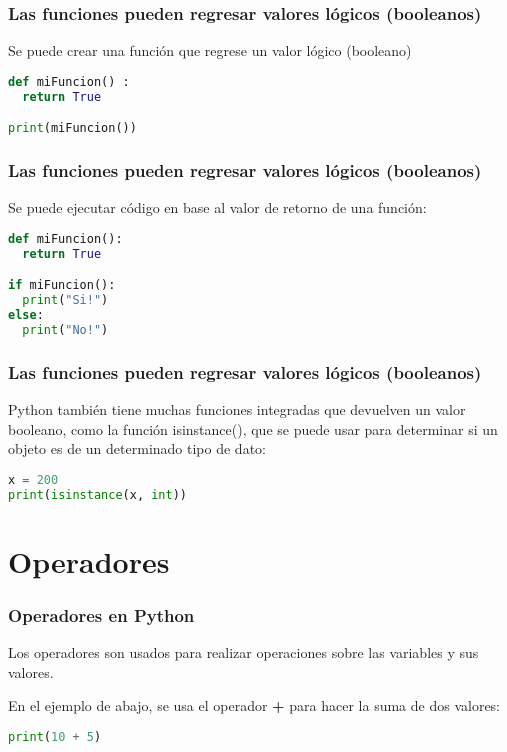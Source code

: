 \begin{frame}[fragile]
  \frametitle{Las funciones pueden regresar valores lógicos (booleanos)}

  Se puede crear una función que regrese un valor lógico (booleano)

  \vspace{\baselineskip}
  \begin{lstlisting}[language=Python]
def miFuncion() :
  return True

print(miFuncion())
  \end{lstlisting}
\end{frame}

\begin{frame}[fragile]
  \frametitle{Las funciones pueden regresar valores lógicos (booleanos)}

  Se puede ejecutar código en base al valor de retorno de una función:

  \vspace{\baselineskip}
  \begin{lstlisting}[language=Python]
def miFuncion():
  return True

if miFuncion():
  print("Si!")
else:
  print("No!") 
  \end{lstlisting}
\end{frame}

\begin{frame}[fragile]
  \frametitle{Las funciones pueden regresar valores lógicos (booleanos)}

  Python también tiene muchas funciones integradas que devuelven un valor
  booleano, como la función \textcolor{codeKeyword}{isinstance}(),
  que se puede usar para determinar si un objeto es de un determinado
  tipo de dato: 

  \vspace{\baselineskip}
  \begin{lstlisting}[language=Python]
x = 200
print(isinstance(x, int)) 
  \end{lstlisting}
\end{frame}

\section{Operadores}

\begin{frame}[fragile]
  \frametitle{Operadores en Python}

  Los operadores son usados para realizar operaciones sobre las variables y
  sus valores.

  \vspace{\baselineskip}
  En el ejemplo de abajo, se usa el operador \textbf{+} para hacer la suma
  de dos valores:

  \vspace{\baselineskip}
  \begin{lstlisting}[language=Python]
  print(10 + 5)
  \end{lstlisting}
\end{frame}

